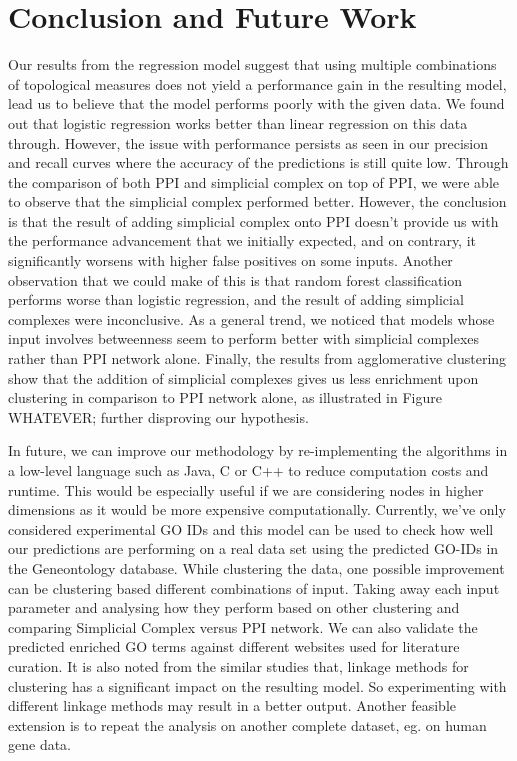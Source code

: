 \documentclass[9pt]{article}
\begin{document}
\section{Conclusion and Future Work}
Our results from the regression model suggest that using multiple combinations of topological measures does not yield a performance gain in the resulting model, lead us to believe that the model performs poorly with the given data. We found out that logistic regression works better than linear regression on this data through. However, the issue with performance persists as seen in our precision and recall curves where the accuracy of the predictions is still quite low. Through the comparison of both PPI and simplicial complex on top of PPI, we were able to observe that the simplicial complex performed better. However, the conclusion is that the result of adding simplicial complex onto PPI doesn’t provide us with the performance advancement that we initially expected, and on contrary, it significantly worsens with higher false positives on some inputs. Another observation that we could make of this is that random forest classification performs worse than logistic regression, and the result of adding simplicial complexes were inconclusive. As a general trend, we noticed that models whose input involves betweenness seem to perform better with simplicial complexes rather than PPI network alone. Finally, the results from agglomerative clustering show that the addition of simplicial complexes gives us less enrichment upon clustering in comparison to PPI network alone, as illustrated in Figure WHATEVER; further disproving our hypothesis.
 
 
In future, we can improve our methodology by re-implementing the algorithms in a low-level language such as Java, C or C++ to reduce computation costs and runtime. This would be especially useful if we are considering nodes in higher dimensions as it would be more expensive computationally. Currently, we’ve only considered experimental GO IDs and this model can be used to check how well our predictions are performing on a real data set using the predicted GO-IDs in the Geneontology database. While clustering the data, one possible improvement can be clustering based different combinations of input. Taking away each input parameter and analysing how they perform based on other clustering and comparing Simplicial Complex versus PPI network. We can also validate the predicted enriched GO terms against different websites used for literature curation. It is also noted from the similar studies that, linkage methods for clustering has a significant impact on the resulting model. So experimenting with different linkage methods may result in a better output. Another feasible extension is to repeat the analysis on another complete dataset, eg. on human gene data.
\end{document}
